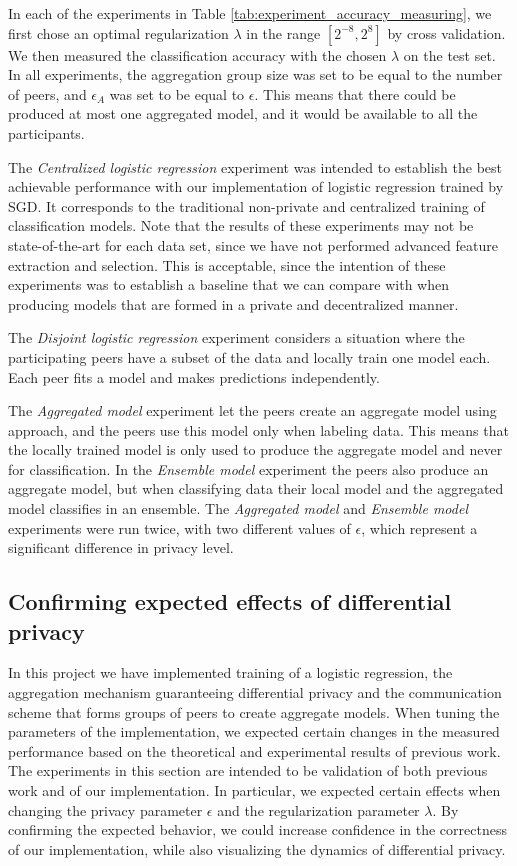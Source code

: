 In each of the experiments in Table \ref{tab:experiment_accuracy_measuring}, we first chose an optimal regularization $\lambda$ in the range $[2^{-8}, 2^8]$ by cross validation. We then measured the classification accuracy with the chosen $\lambda$ on the test set. In all experiments, the aggregation group size was set to be equal to the number of peers, and $\epsilon_{A}$ was set to be equal to $\epsilon$. This means that there could be produced at most one aggregated model, and it would be available to all the participants.

The \textit{Centralized logistic regression} experiment was intended to establish the best achievable performance with our implementation of logistic regression trained by SGD. It corresponds to the traditional non-private and centralized training of classification models. Note that the results of these experiments may not be state-of-the-art for each data set, since we have not performed advanced feature extraction and selection. This is acceptable, since the intention of these experiments was to establish a baseline that we can compare with when producing models that are formed in a private and decentralized manner. 

The \textit{Disjoint logistic regression} experiment considers a situation where the participating peers have a subset of the data and locally train one model each. Each peer fits a model and makes predictions independently.

The \textit{Aggregated model} experiment let the peers create an aggregate model using \cite{pathak2010diffprivhomo} approach, and the peers use this model only when labeling data. This means that the locally trained model is only used to produce the aggregate model and never for classification. In the \textit{Ensemble model} experiment the peers also produce an aggregate model, but when classifying data their local model and the aggregated model classifies in an ensemble. The \textit{Aggregated model} and \textit{Ensemble model} experiments were run twice, with two different values of $\epsilon$, which represent a significant difference in privacy level.

\subsection{Confirming expected effects of differential privacy}

In this project we have implemented training of a logistic regression, the aggregation mechanism guaranteeing differential privacy and the communication scheme that forms groups of peers to create aggregate models. When tuning the parameters of the implementation, we expected certain changes in the measured performance based on the theoretical and experimental results of previous work. The experiments in this section are intended to be validation of both previous work and of our implementation. In particular, we expected certain effects when changing the privacy parameter $\epsilon$ and the regularization parameter $\lambda$. By confirming the expected behavior, we could increase confidence in the correctness of our implementation, while also visualizing the dynamics of differential privacy.

